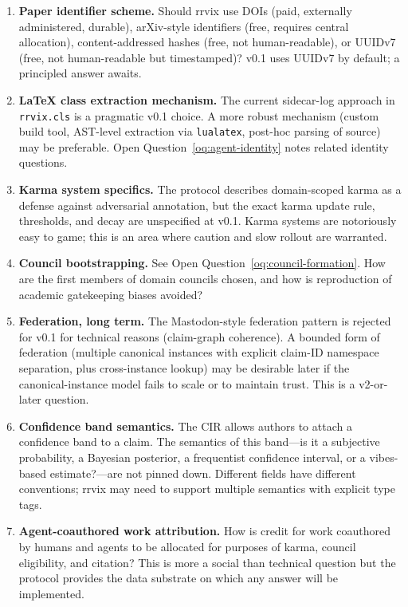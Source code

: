 \documentclass[11pt]{rrvix}
\begin{document}
\begin{enumerate}[leftmargin=2em, itemsep=0.4em]

\item \textbf{Paper identifier scheme.} Should rrvix use DOIs (paid, externally administered, durable), arXiv-style identifiers (free, requires central allocation), content-addressed hashes (free, not human-readable), or UUIDv7 (free, not human-readable but timestamped)? v0.1 uses UUIDv7 by default; a principled answer awaits.

\item \textbf{LaTeX class extraction mechanism.} The current sidecar-log approach in \texttt{rrvix.cls} is a pragmatic v0.1 choice. A more robust mechanism (custom build tool, AST-level extraction via \texttt{lualatex}, post-hoc parsing of source) may be preferable. Open Question~\ref{oq:agent-identity} notes related identity questions.

\item \textbf{Karma system specifics.} The protocol describes domain-scoped karma as a defense against adversarial annotation, but the exact karma update rule, thresholds, and decay are unspecified at v0.1. Karma systems are notoriously easy to game; this is an area where caution and slow rollout are warranted.

\item \textbf{Council bootstrapping.} See Open Question~\ref{oq:council-formation}. How are the first members of domain councils chosen, and how is reproduction of academic gatekeeping biases avoided?

\item \textbf{Federation, long term.} The Mastodon-style federation pattern is rejected for v0.1 for technical reasons (claim-graph coherence). A bounded form of federation (multiple canonical instances with explicit claim-ID namespace separation, plus cross-instance lookup) may be desirable later if the canonical-instance model fails to scale or to maintain trust. This is a v2-or-later question.

\item \textbf{Confidence band semantics.} The CIR allows authors to attach a confidence band to a claim. The semantics of this band---is it a subjective probability, a Bayesian posterior, a frequentist confidence interval, or a vibes-based estimate?---are not pinned down. Different fields have different conventions; rrvix may need to support multiple semantics with explicit type tags.

\item \textbf{Agent-coauthored work attribution.} How is credit for work coauthored by humans and agents to be allocated for purposes of karma, council eligibility, and citation? This is more a social than technical question but the protocol provides the data substrate on which any answer will be implemented.

\end{enumerate}
\end{document}
